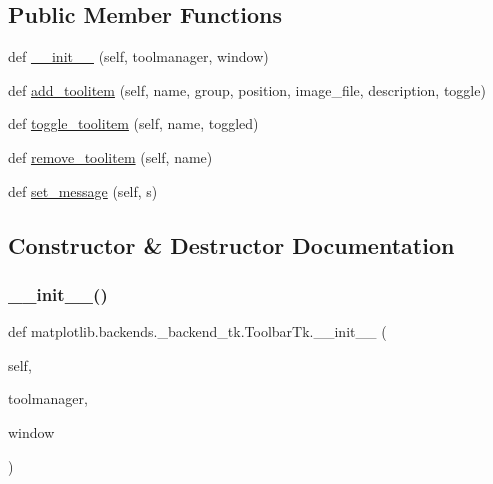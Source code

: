 \subsection*{Public Member Functions}
\begin{DoxyCompactItemize}
\item 
def \hyperlink{classmatplotlib_1_1backends_1_1__backend__tk_1_1ToolbarTk_a724a999ffa808a519d5dc9d991d6278f}{\+\_\+\+\_\+init\+\_\+\+\_\+} (self, toolmanager, window)
\item 
def \hyperlink{classmatplotlib_1_1backends_1_1__backend__tk_1_1ToolbarTk_a43607d7014ecfe7e355dc4c18a0e32fb}{add\+\_\+toolitem} (self, name, group, position, image\+\_\+file, description, toggle)
\item 
def \hyperlink{classmatplotlib_1_1backends_1_1__backend__tk_1_1ToolbarTk_ad1634966b4cc6eb24ff59100f513e950}{toggle\+\_\+toolitem} (self, name, toggled)
\item 
def \hyperlink{classmatplotlib_1_1backends_1_1__backend__tk_1_1ToolbarTk_a1d07bfed09f78b901007d83fd68042fd}{remove\+\_\+toolitem} (self, name)
\item 
def \hyperlink{classmatplotlib_1_1backends_1_1__backend__tk_1_1ToolbarTk_aea778409adb9feb12bdf951de9635f55}{set\+\_\+message} (self, s)
\end{DoxyCompactItemize}


\subsection{Constructor \& Destructor Documentation}
\mbox{\label{classmatplotlib_1_1backends_1_1__backend__tk_1_1ToolbarTk_a724a999ffa808a519d5dc9d991d6278f}} 
\subsubsection{\texorpdfstring{\+\_\+\+\_\+init\+\_\+\+\_\+()}{\_\_init\_\_()}}
{\footnotesize\ttfamily def matplotlib.\+backends.\+\_\+backend\+\_\+tk.\+Toolbar\+Tk.\+\_\+\+\_\+init\+\_\+\+\_\+ (\begin{DoxyParamCaption}\item[{}]{self,  }\item[{}]{toolmanager,  }\item[{}]{window }\end{DoxyParamCaption})}



